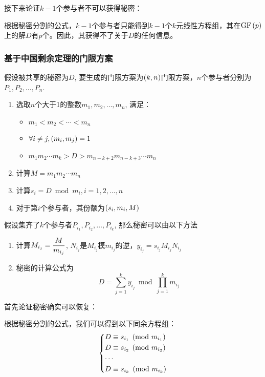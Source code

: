 接下来论证$k-1$个参与者不可以获得秘密：\par
根据秘密分割的公式，$k-1$个参与者只能得到$k-1$个$k$元线性方程组，其在$\mathrm{GF}\left( {p}\right)$上的解$D$有$p$个。因此，其获得不了关于$D$的任何信息。
\subsubsection{基于中国剩余定理的门限方案}
假设被共享的秘密为$D$, 要生成的门限方案为$\left( {k, n}\right)$门限方案，$n$个参与者分别为$P_1, P_2,\ldots, P_n$.
\begin{enumerate}
	\item 选取$n$个大于1的整数$m_1, m_2, \ldots, m_n$, 满足：
	\begin{itemize}
		\item $m_1<m_2<\cdots <m_n$
		\item $\forall i\neq j, \left( {m_i, m_j}\right)=1$
		\item $m_1m_2\cdots m_k>D>m_{n-k+2}m_{n-k+3}\cdots m_n$
	\end{itemize}
	\item 计算$M=m_1m_2\cdots m_n$
	\item 计算$s_i=D\bmod{m_i}, i=1, 2,\ldots, n$
	\item 对于第$i$个参与者，其份额为$\left( {s_i, m_i, M}\right)$
\end{enumerate}
假设集齐了$k$个参与者$P_{i_1}, P_{i_2}, \ldots, P_{i_k}$, 那么秘密可以由以下方法
\begin{enumerate}
	\item 计算$\displaystyle M_{i_j}=\frac{M}{m_{i_j}}$, $N_{i_j}$是$M_{i_j}$模$m_{i_j}$的逆，$y_{i_j}=s_{i_j}M_{i_j}N_{i_j}$
	\item 秘密的计算公式为
	\begin{equation}
	D=\sum_{j=1}^ky_{i_j}\bmod{\prod_{j=1}^km_{i_j}}
	\end{equation}
\end{enumerate}
首先论证秘密确实可以恢复：\par
根据秘密分割的公式，我们可以得到以下同余方程组：
\begin{equation}
\begin{dcases}
D\equiv s_{i_1}\pmod{m_{i_1}}\\
D\equiv s_{i_2}\pmod{m_{i_2}}\\
\cdots\\
D\equiv s_{i_k}\pmod{m_{i_k}}
\end{dcases}
\end{equation}

